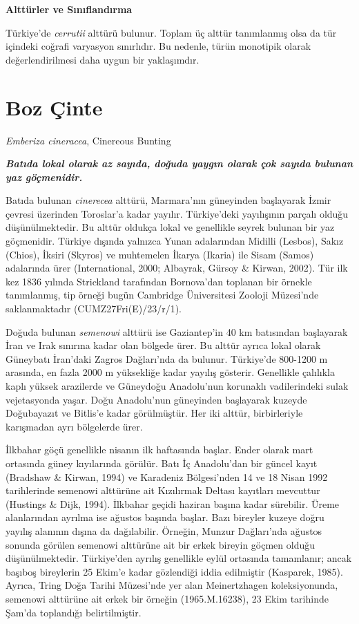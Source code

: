 \documentclass[
  10.5pt,
  a4paper,
  DIV=11,
  numbers=noendperiod,
  twocolumn]{scrreprt}
\begin{document}
\textbf{Alttürler ve Sınıflandırma}

Türkiye'de \emph{cerrutii} alttürü bulunur. Toplam üç alttür tanımlanmış
olsa da tür içindeki coğrafi varyasyon sınırlıdır. Bu nedenle, türün
monotipik olarak değerlendirilmesi daha uygun bir yaklaşımdır.

\section{Boz Çinte}\label{boz-uxe7inte}

\emph{Emberiza cineracea}, Cinereous Bunting

\textbf{\emph{Batıda lokal olarak az sayıda, doğuda yaygın olarak çok
sayıda bulunan yaz göçmenidir.}}

Batıda bulunan \emph{cinerecea} alttürü, Marmara'nın güneyinden
başlayarak İzmir çevresi üzerinden Toroslar'a kadar yayılır.
Türkiye'deki yayılışının parçalı olduğu düşünülmektedir. Bu alttür
oldukça lokal ve genellikle seyrek bulunan bir yaz göçmenidir. Türkiye
dışında yalnızca Yunan adalarından Midilli (Lesbos), Sakız (Chios),
İksiri (Skyros) ve muhtemelen İkarya (Ikaria) ile Sisam (Samos)
adalarında ürer (International, 2000; Albayrak, Gürsoy \& Kirwan, 2002).
Tür ilk kez 1836 yılında Strickland tarafından Bornova'dan toplanan bir
örnekle tanımlanmış, tip örneği bugün Cambridge Üniversitesi Zooloji
Müzesi'nde saklanmaktadır (CUMZ27Fri(E)/23/r/1).

Doğuda bulunan \emph{semenowi} alttürü ise Gaziantep'in 40 km batısından
başlayarak İran ve Irak sınırına kadar olan bölgede ürer. Bu alttür
ayrıca lokal olarak Güneybatı İran'daki Zagros Dağları'nda da bulunur.
Türkiye'de 800-1200 m arasında, en fazla 2000 m yüksekliğe kadar yayılış
gösterir. Genellikle çalılıkla kaplı yüksek arazilerde ve Güneydoğu
Anadolu'nun korunaklı vadilerindeki sulak vejetasyonda yaşar. Doğu
Anadolu'nun güneyinden başlayarak kuzeyde Doğubayazıt ve Bitlis'e kadar
görülmüştür. Her iki alttür, birbirleriyle karışmadan ayrı bölgelerde
ürer.

İlkbahar göçü genellikle nisanın ilk haftasında başlar. Ender olarak
mart ortasında güney kıyılarında görülür. Batı İç Anadolu'dan bir güncel
kayıt (Bradshaw \& Kirwan, 1994) ve Karadeniz Bölgesi'nden 14 ve 18
Nisan 1992 tarihlerinde semenowi alttürüne ait Kızılırmak Deltası
kayıtları mevcuttur (Hustings \& Dijk, 1994). İlkbahar geçidi haziran
başına kadar sürebilir. Üreme alanlarından ayrılma ise ağustos başında
başlar. Bazı bireyler kuzeye doğru yayılış alanının dışına da
dağılabilir. Örneğin, Munzur Dağları'nda ağustos sonunda görülen
semenowi alttürüne ait bir erkek bireyin göçmen olduğu düşünülmektedir.
Türkiye'den ayrılış genellikle eylül ortasında tamamlanır; ancak başıboş
bireylerin 25 Ekim'e kadar gözlendiği iddia edilmiştir (Kasparek, 1985).
Ayrıca, Tring Doğa Tarihi Müzesi'nde yer alan Meinertzhagen
koleksiyonunda, semenowi alttürüne ait erkek bir örneğin (1965.M.16238),
23 Ekim tarihinde Şam'da toplandığı belirtilmiştir.
\end{document}
